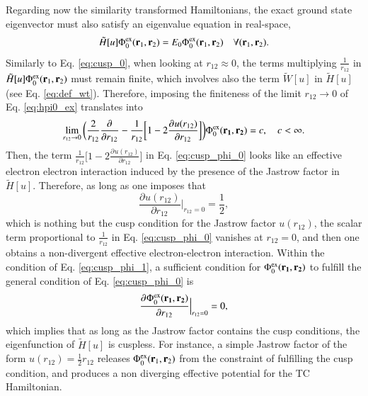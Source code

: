 \documentclass[aip,jcp,reprint,noshowkeys,superscriptaddress,twocolumn]{revtex4-1}
\newcommand{\deriv}[3]{\frac{\partial^{#3} #1}{\partial {#2}^{#3}}}
\newcommand{\bd}[1]{{\bf {#1}}}
\newcommand{\br}[0]{{\bf {r}}}
\newcommand{\phiex}[0]{\Phi^{\text{ex}}_0}
\begin{document}
Regarding now the similarity transformed Hamiltonians, the exact ground state eigenvector must also satisfy an eigenvalue equation in real-space,
\begin{equation}
 \label{eq:hpi0_ex}
 \tilde{H}[u] \phiex(\br{}_1,\br{}_2) = E_0 \phiex(\br{}_1,\br{}_2) \quad \forall (\br{}_1,\br{}_2).
\end{equation}
Similarly to Eq. \eqref{eq:cusp_0}, when looking at $r_{12}\approx 0$, the terms multiplying $\frac{1}{r_{12}}$ in $\tilde{H}[u]\phiex(\br{}_1,\br{}_2)$ must remain finite, 
which involves also the term $\tilde{W}[u]$ in $\tilde{H}[u]$ (see Eq. \eqref{eq:def_wt}). Therefore, imposing the finiteness of the limit $r_{12}\rightarrow 0$ of Eq. \eqref{eq:hpi0_ex} translates into
\begin{equation}
 \label{eq:cusp_phi_0}
 \lim_{r_{12}\rightarrow 0}\bigg( \frac{2}{r_{12}} \deriv{}{r_{12}}{} -\frac{1}{r_{12}}\bigg[ 1 - 2 \deriv{u(r_{12})}{r_{12}}{}\bigg]\bigg) \phiex(\bd{r_1},\bd{r_2})  = c,\quad c<\infty.
\end{equation}
Then, the term $\frac{1}{r_{12}}\bigg[ 1 - 2\deriv{u(r_{12})}{r_{12}}{}\bigg]$ in Eq. \eqref{eq:cusp_phi_0} looks like an effective electron electron interaction induced by the presence of the Jastrow factor in $\tilde{H}[u]$. 
Therefore, as long as one imposes that 
\begin{equation}
 \label{eq:cusp_phi_1}
  \deriv{u(r_{12})}{r_{12}}{}\bigg|_{r_{12}=0} = \frac{1}{2},
\end{equation}
which is nothing but the cusp condition for the Jastrow factor $u(r_{12})$, the scalar term proportional to $\frac{1}{r_{12}}$ in Eq. \eqref{eq:cusp_phi_0} vanishes at $r_{12}=0$, and then one obtains a non-divergent effective electron-electron interaction. 
Within the condition of Eq. \eqref{eq:cusp_phi_1}, a sufficient condition for $\phiex(\bd{r_1},\bd{r_2})$ to fulfill the general condition of Eq. \eqref{eq:cusp_phi_0} is
\begin{equation}
 \label{eq:cusp_phi_2}
 \deriv{\phiex(\bd{r_1},\bd{r_2})}{r_{12}}{}\Bigr|_{r_{12}=0} = 0, 
\end{equation}
which implies that as long as the Jastrow factor contains the cusp conditions, the eigenfunction of $\tilde{H}[u]$ is cuspless. 
For instance, a simple Jastrow factor of the form $u(r_{12}) = \frac{1}{2} r_{12}$ releases $\phiex(\br{}_1,\br{}_2)$ from 
the constraint of fulfilling the cusp condition, and produces a non diverging effective potential for the TC Hamiltonian. 
\end{document}
